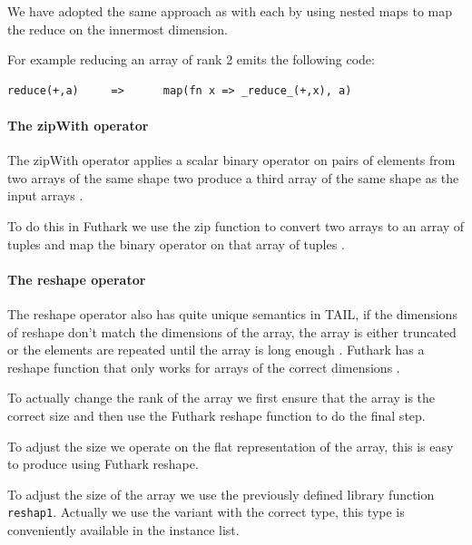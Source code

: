 \documentclass[11pt]{article}
\begin{document}
We have adopted the same approach as with each by using nested maps to map the reduce on the innermost dimension.
 
For example reducing an array of rank 2 emits the following code:
 
\begin{lstlisting}[numbers=none,frame=none]
reduce(+,a)     =>      map(fn x => _reduce_(+,x), a)
\end{lstlisting}


\paragraph{The zipWith operator}
The zipWith operator applies a scalar binary operator on pairs of elements from two arrays of the same shape two
produce a third array of the same shape as the input arrays \cite{ElsmanDybdal:Array:2014}.
 
To do this in Futhark we use the zip function to convert two arrays to an array of tuples and map the binary operator on that array of tuples \cite{TroelsHenriksen}.


\paragraph{The reshape operator} 
The reshape operator also has quite unique semantics in TAIL, if the dimensions of reshape don't match the dimensions of the array, the
array is either truncated or the elements are repeated until the array is long enough \cite{ElsmanDybdal:Array:2014}.
Futhark has a reshape function that only works for arrays of the correct dimensions \cite{TroelsHenriksen}.

To actually change the rank of the array we first ensure that the array is the correct size and then use the Futhark reshape
function to do the final step.

To adjust the size we operate on the flat representation of the array, this is easy to produce using Futhark reshape.

To adjust the size of the array we use the previously defined library function {\tt reshap1}. Actually we use the variant with
the correct type, this type is conveniently available in the instance list.
\end{document}

